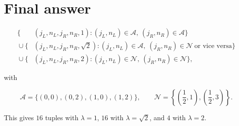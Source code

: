 \documentclass[11pt]{article}
\begin{document}
\section*{Final answer}


\[
\boxed{
\begin{aligned}
\Big\{&(j_L,n_L,j_R,n_R,1):
 (j_L,n_L)\in\mathcal A,\ (j_R,n_R)\in\mathcal A\Big\}\\
{}\cup\Big\{&(j_L,n_L,j_R,n_R,\sqrt2):
 (j_L,n_L)\in\mathcal A,\ (j_R,n_R)\in\mathcal N
 \ \text{or vice versa}\Big\}\\
{}\cup\Big\{&(j_L,n_L,j_R,n_R,2):
 (j_L,n_L)\in\mathcal N,\ (j_R,n_R)\in\mathcal N\Big\},
\end{aligned}}
\]

with

\[
\mathcal A=\{(0,0),(0,2),(1,0),(1,2)\},
\qquad
\mathcal N=\left\{\left(\frac12,1\right),\left(\frac12,3\right)\right\}.
\]

This gives $16$ tuples with $\lambda=1$, $16$ with $\lambda=\sqrt2$, and $4$ with $\lambda=2$.
\end{document}
